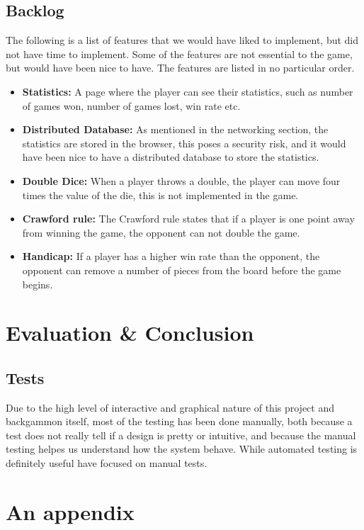 \documentclass[ twoside,openright,titlepage,numbers=noenddot,headinclude,%
                footinclude=true,cleardoublepage=empty,abstractoff, %
                BCOR=5mm,paper=a4,fontsize=11pt,%
                ngerman,american,%
                ]{scrreprt}
\begin{document}
\section{Backlog}
The following is a list of features that we would have liked to implement, but did not have time to implement. Some of the features are not essential to the game, but would have been nice to have. The features are listed in no particular order.
\begin{itemize}
  \item \textbf{Statistics:} A page where the player can see their statistics, such as number of games won, number of games lost, win rate etc.
  \item \textbf{Distributed Database:} As mentioned in the networking section, the statistics are stored in the browser, this poses a security risk, and it would have been nice to have a distributed database to store the statistics.
  \item \textbf{Double Dice:} When a player throws a double, the player can move four times the value of the die, this is not implemented in the game.
  \item \textbf{Crawford rule:} The Crawford rule states that if a player is one point away from winning the game, the opponent can not double the game. 
  \item \textbf{Handicap:} If a player has a higher win rate than the opponent, the opponent can remove a number of pieces from the board before the game begins.
\end{itemize}


\chapter{Evaluation \& Conclusion}
\label{cha:evaluation}


\section{Tests}
Due to the high level of interactive and graphical nature of this project and backgammon itself, most of the testing has been done manually, both because a test does not really tell if a design is pretty or intuitive, and because the manual testing helpes us understand how the system behave. While automated testing is definitely useful have focused on manual tests. 



\appendix
\cleardoublepage

\chapter{An appendix}
\label{cha:an-appendix}
\end{document}

